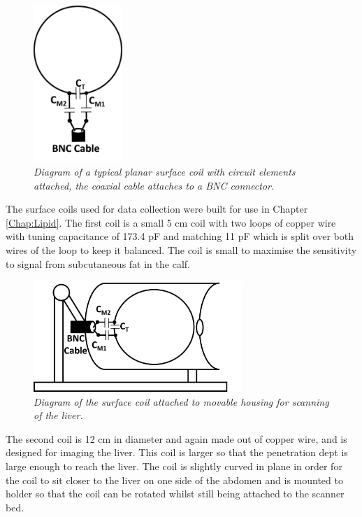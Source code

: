 \begin{figure}
    \centering
    \includegraphics[width=0.3\textwidth]{Figures/Theory/Surface_Coil.png}
    \caption{\textit{Diagram of a typical planar surface coil with circuit elements attached, the coaxial cable attaches to a BNC connector.}}
    \label{fig:theory:Surface}
\end{figure}

The surface coils used for data collection were built for use in Chapter \ref{Chap:Lipid}. The first coil is a small 5 cm coil with two loops of copper wire with tuning capacitance of 173.4 pF and matching 11 pF which is split over both wires of the loop to keep it balanced. The coil is small to maximise the sensitivity to signal from subcutaneous fat in the calf.

\begin{figure}
    \centering
    \includegraphics[width=0.7\textwidth]{Figures/Theory/Liver_Coil.png}
    \caption{\textit{Diagram of the surface coil attached to movable housing for scanning of the liver.}}
    \label{fig:theory:Liver}
\end{figure}

The second coil is 12 cm in diameter and again made out of copper wire, and is designed for imaging the liver. This coil is larger so that the penetration dept is large enough to reach the liver. The coil is slightly curved in plane in order for the coil to sit closer to the liver on one side of the abdomen and is mounted to holder so that the coil can be rotated whilst still being attached to the scanner bed.

